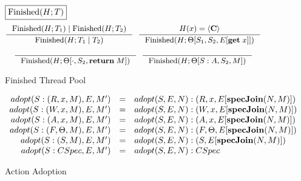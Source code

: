 
\nopagebreak
\onecolumn

\begin{figure}
$\boxed{\text{Finished}(H; T)} $
\[
\mbox{\small
\inference[]{\finished(H; T_1) \; | \; \finished(H; T_2)} {\finished(H; T_1 \; | \; T_2)}\;
\inference[]{H(x) = \langle \commit \rangle} {\finished(H; \Theta[S_1, S_2, \eval{\getKW \; x}])}
}
\]

\[
\mbox{\small
\inference[]{}{\finished(H; \Theta[\cdot, S_2, \return \; M])} \;
\inference[]{}{\finished(H; \Theta[S:A, S_2, M])}
}
\]
\caption{Finished Thread Pool}
\label{fig:finished}
\end{figure}

\begin{figure}
\begin{displaymath}
\begin{array}{rcll}
adopt(S : (R, x, M), E, M') &=& adopt(S, E, N) : (R, x, E[\text{\bf specJoin}(N, M)]) \\
adopt(S : (W, x, M), E, M') &=& adopt(S, E, N) : (W, x, E[\text{\bf specJoin}(N, M)]) \\
adopt(S : (A, x, M), E, M') &=& adopt(S, E, N) : (A, x, E[\text{\bf specJoin}(N, M)]) \\
adopt(S : (F, \Theta, M), E, M') &=& adopt(S, E, N) : (F, \Theta, E[\text{\bf specJoin}(N, M)]) \\
adopt(S : (S, M), E, M') &=& adopt(S, E, N) : (S, E[\text{\bf specJoin}(N, M)]) \\
adopt(S : CSpec, E, M') &=& adopt(S, E, N) : CSpec\\
\end{array}
\end{displaymath}
\caption{Action Adoption}
\label{fig:adopt}
\end{figure}


